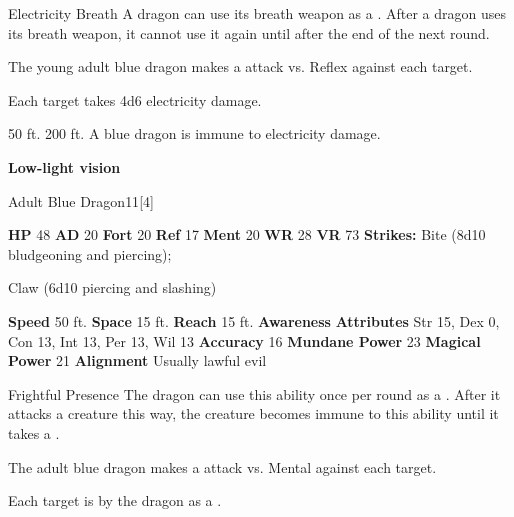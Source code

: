     \begin{freeability}{Electricity Breath}
      A dragon can use its breath weapon as a .
      After a dragon uses its breath weapon, it cannot use it again until after the end of the next round.
      \par The young adult blue dragon makes a  attack
        vs. Reflex against each target.
    
    \hit Each target takes 4d6 electricity damage.
    \end{freeability}
  
      
       50 ft.
     200 ft.
     A blue dragon is immune to electricity damage.
    \par\noindent\textbf{Low-light vision}
  

  \begin{monsubsection}{Adult Blue Dragon}{11}[4]
    \vspace{-1em}\vspace{-1em}
    \vspace{0em}

    
    

    \begin{spellcontent}
      \begin{spelltargetinginfo}
        \pari \textbf{HP} 48 \monsep
          \textbf{AD} 20 \monsep
          \textbf{Fort} 20 \monsep
          \textbf{Ref} 17 \monsep
          \textbf{Ment} 20
        \pari \textbf{WR} 28 \monsep
        \textbf{VR} 73
        \pari \textbf{Strikes:}
            Bite  (8d10 bludgeoning and piercing);
\par Claw  (6d10 piercing and slashing)
      \end{spelltargetinginfo}
    \end{spellcontent}
    \begin{monsterfooter}
      \pari \textbf{Speed} 50 ft. \monsep
        \textbf{Space} 15 ft. \monsep
        \textbf{Reach} 15 ft.
      \pari \textbf{Awareness} 
      \pari \textbf{Attributes}
        Str 15, Dex 0,
        Con 13, Int 13,
        Per 13, Wil 13
      \pari \textbf{Accuracy} 16 \monsep
        \textbf{Mundane Power} 23 \monsep
      \textbf{Magical Power} 21
      \pari \textbf{Alignment} Usually lawful evil
    \end{monsterfooter}
  \end{monsubsection}
  \begin{freeability}{Frightful Presence}
      The dragon can use this ability once per round as a .
      After it attacks a creature this way, the creature becomes immune to this ability until it takes a .
      \par The adult blue dragon makes a  attack
        vs. Mental against each target.
    
    \hit Each target is  by the dragon as a .
    \end{freeability}
  

